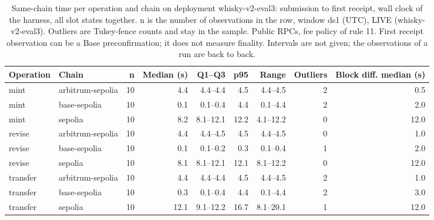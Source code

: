 \begin{table}[htbp]
    \centering
    \small
    \begin{tabular}{llrrrrrrr}
    \toprule
    Operation & Chain & n & Median (s) & Q1--Q3 & p95 & Range & Outliers & Block diff. median (s) \\
    \midrule
    mint & arbitrum-sepolia & 10 & 4.4 & 4.4--4.4 & 4.5 & 4.4--4.5 & 2 & 0.5 \\
    mint & base-sepolia & 10 & 0.1 & 0.1--0.4 & 4.4 & 0.1--4.4 & 2 & 2.0 \\
    mint & sepolia & 10 & 8.2 & 8.1--12.1 & 12.2 & 4.1--12.2 & 0 & 12.0 \\
    revise & arbitrum-sepolia & 10 & 4.4 & 4.4--4.5 & 4.5 & 4.4--4.5 & 0 & 1.0 \\
    revise & base-sepolia & 10 & 0.1 & 0.1--0.2 & 0.3 & 0.1--0.4 & 1 & 2.0 \\
    revise & sepolia & 10 & 8.1 & 8.1--12.1 & 12.1 & 8.1--12.2 & 0 & 12.0 \\
    transfer & arbitrum-sepolia & 10 & 4.4 & 4.4--4.4 & 4.5 & 4.4--4.5 & 2 & 1.0 \\
    transfer & base-sepolia & 10 & 0.3 & 0.1--0.4 & 4.4 & 0.1--4.4 & 2 & 3.0 \\
    transfer & sepolia & 10 & 12.1 & 9.1--12.2 & 16.7 & 8.1--20.1 & 1 & 12.0 \\
    \bottomrule
    \end{tabular}
    \caption{Same-chain time per operation and chain on deployment whisky-v2-eval3: submission to first receipt, wall clock of the harness, all slot states together. n is the number of observations in the row, window ds1 (UTC), LIVE (whisky-v2-eval3). Outliers are Tukey-fence counts and stay in the sample. Public RPCs, fee policy of rule 11. First receipt observation can be a Base preconfirmation; it does not measure finality. Intervals are not given; the observations of a run are back to back.}
    \label{tab:confirmation-time}
\end{table}
